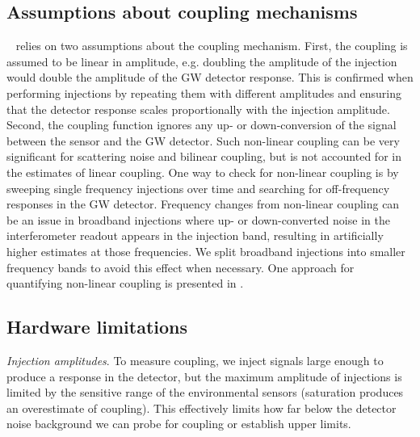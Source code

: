 \subsection{Assumptions about coupling mechanisms}

~ relies on two assumptions about the coupling mechanism.
First, the coupling is assumed to be linear in amplitude, e.g. doubling the amplitude of the injection would double the amplitude of the \ac{GW} detector response.
This is confirmed when performing injections by repeating them with different amplitudes and ensuring that the detector response scales proportionally with the injection amplitude.
Second, the coupling function ignores any up- or down-conversion of the signal between the sensor and the \ac{GW} detector.
Such non-linear coupling can be very significant for scattering noise and bilinear coupling, but is not accounted for in the estimates of linear coupling.
One way to check for non-linear coupling is by sweeping single frequency injections over time and searching for off-frequency responses in the \ac{GW} detector.
Frequency changes from non-linear coupling can be an issue in broadband injections where up- or down-converted noise in the interferometer readout appears in the injection band, resulting in artificially higher estimates at those frequencies.
We split broadband injections into smaller frequency bands to avoid this effect when necessary.
One approach for quantifying non-linear coupling is presented in \citet{Washimi_2020}.

\subsection{Hardware limitations}\label{sec:uncertainties-hardware}

\textit{Injection amplitudes}. To measure coupling, we inject signals large enough to produce a response in the detector, but the maximum amplitude of injections is limited by the sensitive range of the environmental sensors (saturation produces an overestimate of coupling).
This effectively limits how far below the detector noise background we can probe for coupling or establish upper limits.


